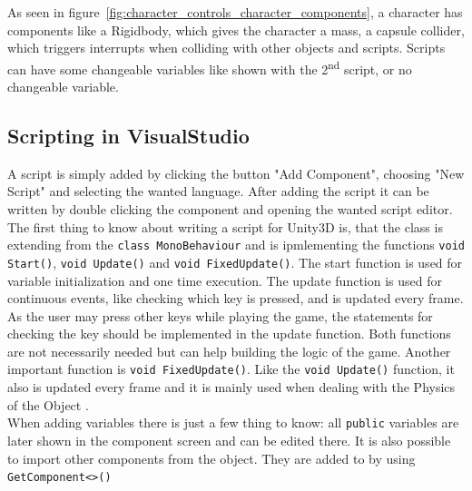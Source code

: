 \documentclass[conference]{IEEEtran}
\begin{document}
As seen in figure~\ref{fig:character_controls_character_components}, a character has components like a Rigidbody, which gives the character a mass, a capsule collider, which triggers interrupts when colliding with other objects and scripts. Scripts can have some changeable variables like shown with the 2\textsuperscript{nd} script, or no changeable variable.

\lstset{
basicstyle=\ttfamily\small,
numbers=left,
breaklines=true,
numberstyle=\tiny,
numbersep=5pt,
tabsize=3
}

\lstset{language=[Sharp]C}

\subsection{Scripting in VisualStudio}

A script is simply added by clicking the button "Add Component", choosing "New Script" and selecting the wanted language. After adding the script it can be written by double clicking the component and opening the wanted script editor. \\
The first thing to know about writing a script for Unity3D is, that the class is extending from the \lstinline!class MonoBehaviour! and is ipmlementing the functions \lstinline!void Start()!, \lstinline!void Update()! and \lstinline!void FixedUpdate()!. 
The start function is used for variable initialization and one time execution.
The update function is used for continuous events, like checking which key is pressed, and is updated every frame\cite{b1}. As the user may press other keys while playing the game, the statements for checking the key should be implemented in the update function. Both functions are not necessarily needed but can help building the logic of the game.
Another important function is \lstinline!void FixedUpdate()!. Like the \lstinline!void Update()! function, it also is updated every frame and it is mainly used when dealing with the Physics of the Object \cite{b1}. \\
When adding variables there is just a few thing to know: all \lstinline!public! variables are later shown in the component screen and can be edited there. It is also possible to import other components from the object. They are added to by using \lstinline!GetComponent<>()!
\end{document}
